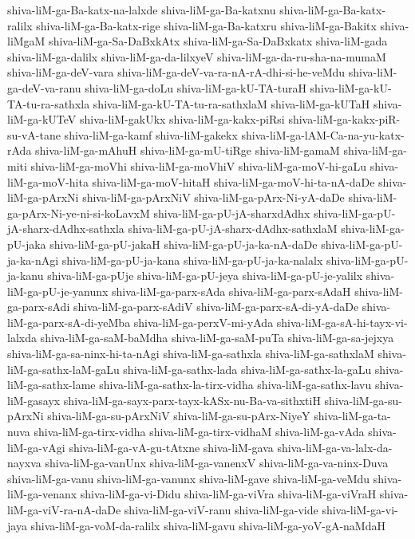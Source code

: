 {shiva-liM-ga-Ba-katx-na-lalxde
shiva-liM-ga-Ba-katxnu
shiva-liM-ga-Ba-katx-ralilx
shiva-liM-ga-Ba-katx-rige
shiva-liM-ga-Ba-katxru
shiva-liM-ga-Bakitx
shiva-liMgaM
shiva-liM-ga-Sa-DaBxkAtx
shiva-liM-ga-Sa-DaBxkatx
shiva-liM-gada
shiva-liM-ga-dalilx
shiva-liM-ga-da-lilxyeV
shiva-liM-ga-da-ru-sha-na-mumaM
shiva-liM-ga-deV-vara
shiva-liM-ga-deV-va-ra-nA-rA-dhi-si-he-veMdu
shiva-liM-ga-deV-va-ranu
shiva-liM-ga-doLu
shiva-liM-ga-kU-TA-turaH
shiva-liM-ga-kU-TA-tu-ra-sathxla
shiva-liM-ga-kU-TA-tu-ra-sathxlaM
shiva-liM-ga-kUTaH
shiva-liM-ga-kUTeV
shiva-liM-gakUkx
shiva-liM-ga-kakx-piRsi
shiva-liM-ga-kakx-piR-su-vA-tane
shiva-liM-ga-kamf
shiva-liM-gakekx
shiva-liM-ga-lAM-Ca-na-yu-katx-rAda
shiva-liM-ga-mAhuH
shiva-liM-ga-mU-tiRge
shiva-liM-gamaM
shiva-liM-ga-miti
shiva-liM-ga-moVhi
shiva-liM-ga-moVhiV
shiva-liM-ga-moV-hi-gaLu
shiva-liM-ga-moV-hita
shiva-liM-ga-moV-hitaH
shiva-liM-ga-moV-hi-ta-nA-daDe
shiva-liM-ga-pArxNi
shiva-liM-ga-pArxNiV
shiva-liM-ga-pArx-Ni-yA-daDe
shiva-liM-ga-pArx-Ni-ye-ni-si-koLavxM
shiva-liM-ga-pU-jA-sharxdAdhx
shiva-liM-ga-pU-jA-sharx-dAdhx-sathxla
shiva-liM-ga-pU-jA-sharx-dAdhx-sathxlaM
shiva-liM-ga-pU-jaka
shiva-liM-ga-pU-jakaH
shiva-liM-ga-pU-ja-ka-nA-daDe
shiva-liM-ga-pU-ja-ka-nAgi
shiva-liM-ga-pU-ja-kana
shiva-liM-ga-pU-ja-ka-nalalx
shiva-liM-ga-pU-ja-kanu
shiva-liM-ga-pUje
shiva-liM-ga-pU-jeya
shiva-liM-ga-pU-je-yalilx
shiva-liM-ga-pU-je-yanunx
shiva-liM-ga-parx-sAda
shiva-liM-ga-parx-sAdaH
shiva-liM-ga-parx-sAdi
shiva-liM-ga-parx-sAdiV
shiva-liM-ga-parx-sA-di-yA-daDe
shiva-liM-ga-parx-sA-di-yeMba
shiva-liM-ga-perxV-mi-yAda
shiva-liM-ga-sA-hi-tayx-vi-lalxda
shiva-liM-ga-saM-baMdha
shiva-liM-ga-saM-puTa
shiva-liM-ga-sa-jejxya
shiva-liM-ga-sa-ninx-hi-ta-nAgi
shiva-liM-ga-sathxla
shiva-liM-ga-sathxlaM
shiva-liM-ga-sathx-laM-gaLu
shiva-liM-ga-sathx-lada
shiva-liM-ga-sathx-la-gaLu
shiva-liM-ga-sathx-lame
shiva-liM-ga-sathx-la-tirx-vidha
shiva-liM-ga-sathx-lavu
shiva-liM-gasayx
shiva-liM-ga-sayx-parx-tayx-kASx-nu-Ba-va-sithxtiH
shiva-liM-ga-su-pArxNi
shiva-liM-ga-su-pArxNiV
shiva-liM-ga-su-pArx-NiyeY
shiva-liM-ga-ta-nuva
shiva-liM-ga-tirx-vidha
shiva-liM-ga-tirx-vidhaM
shiva-liM-ga-vAda
shiva-liM-ga-vAgi
shiva-liM-ga-vA-gu-tAtxne
shiva-liM-gava
shiva-liM-ga-va-lalx-da-nayxva
shiva-liM-ga-vanUnx
shiva-liM-ga-vanenxV
shiva-liM-ga-va-ninx-Duva
shiva-liM-ga-vanu
shiva-liM-ga-vanunx
shiva-liM-gave
shiva-liM-ga-veMdu
shiva-liM-ga-venanx
shiva-liM-ga-vi-Didu
shiva-liM-ga-viVra
shiva-liM-ga-viVraH
shiva-liM-ga-viV-ra-nA-daDe
shiva-liM-ga-viV-ranu
shiva-liM-ga-vide
shiva-liM-ga-vi-jaya
shiva-liM-ga-voM-da-ralilx
shiva-liM-gavu
shiva-liM-ga-yoV-gA-naMdaH
}
